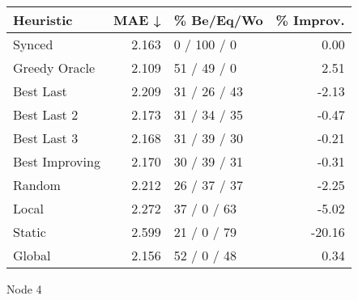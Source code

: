 \begin{tabular}{lrlr}
\toprule
\textbf{Heuristic} & \textbf{MAE ↓} & \textbf{\% Be/Eq/Wo} & \textbf{\% Improv.} \\
\midrule
            Synced &          2.163 &          0 / 100 / 0 &                0.00 \\
     Greedy Oracle &          2.109 &          51 / 49 / 0 &                2.51 \\
         Best Last &          2.209 &         31 / 26 / 43 &               -2.13 \\
       Best Last 2 &          2.173 &         31 / 34 / 35 &               -0.47 \\
       Best Last 3 &          2.168 &         31 / 39 / 30 &               -0.21 \\
    Best Improving &          2.170 &         30 / 39 / 31 &               -0.31 \\
            Random &          2.212 &         26 / 37 / 37 &               -2.25 \\
             Local &          2.272 &          37 / 0 / 63 &               -5.02 \\
            Static &          2.599 &          21 / 0 / 79 &              -20.16 \\
            Global &          2.156 &          52 / 0 / 48 &                0.34 \\
\bottomrule
\end{tabular}
\caption{Node 4}
\label{tab:hr_iid_lr05_le2_bs4_4}
